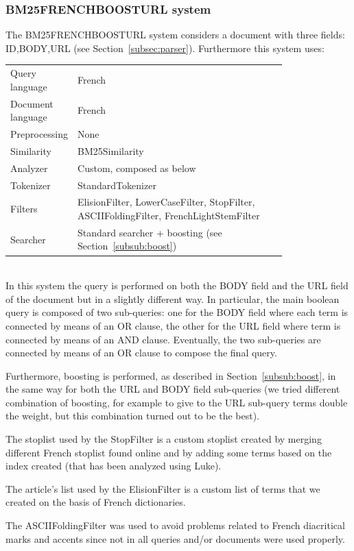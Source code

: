 \subsubsection{BM25FRENCHBOOSTURL system}
\label{subsub:BM25FRENCHBOOSTURL}
The BM25FRENCHBOOSTURL system considers a document with three fields: ID,BODY,URL (see Section~\ref{subsec:parser}). Furthermore this system uses:
\begin{table}[h!]
    \centering
    \begin{tabular}{l p{0.8\linewidth}}
    Query language & French\\
    Document language & French\\
    Preprocessing & None\\
    Similarity & BM25Similarity\\
    Analyzer & Custom, composed as below\\
    Tokenizer & StandardTokenizer\\
    Filters & ElisionFilter, LowerCaseFilter, StopFilter, ASCIIFoldingFilter, FrenchLightStemFilter\\
    Searcher & Standard searcher + boosting (see Section~\ref{subsub:boost})
    \end{tabular}
\end{table}
\\
In this system the query is performed on both the BODY field and the URL field of the document but in a slightly different way. In particular, the main boolean query is composed of two sub-queries: one for the BODY field where each term is connected by means of an OR clause, the other for the URL field where term is connected by means of an AND clause. Eventually, the two sub-queries are connected by means of an OR clause to compose the final query.
\par
Furthermore, boosting is performed, as described in Section~\ref{subsub:boost}, in the same way for both the URL and BODY field sub-queries (we tried different combination of boosting, for example to give to the URL sub-query terms double the weight, but this combination turned out to be the best).
\par
The stoplist used by the StopFilter is a custom stoplist created by merging different French stoplist found online and by adding some terms based on the index created (that has been analyzed using Luke).
\par 
The article's list used by the ElisionFilter is a custom list of terms that we created on the basis of French dictionaries. 
\par
The ASCIIFoldingFilter was used to avoid problems related to French diacritical marks and accents since not in all queries and/or documents were used properly.

